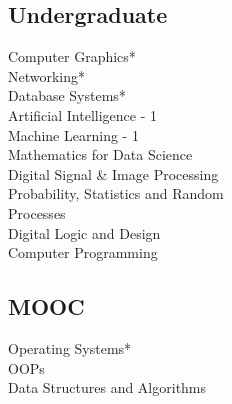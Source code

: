 \documentclass[]{deedy-resume-openfont}
\begin{document}
\begin{minipage}[t]{0.32\textwidth}
\subsection{Undergraduate}
\textbullet{} Computer Graphics*\\
\textbullet{} Networking*\\
\textbullet{} Database Systems*\\
\textbullet{} Artificial Intelligence - 1\\
\textbullet{} Machine Learning - 1 \\
\textbullet{} Mathematics for Data Science\\
\textbullet{} Digital Signal \& Image Processing\\
\textbullet{} Probability, Statistics and Random\\
\hspace{2.7mm}Processes\\
\textbullet{} Digital Logic and Design\\
\textbullet{} Computer Programming\\
\sectionsep

\subsection{MOOC}
\textbullet{} Operating Systems*\\
\textbullet{} OOPs\\
\textbullet{} Data Structures and Algorithms\\

\sectionsep

%
%

\end{minipage} 
\hfill
\end{document}
